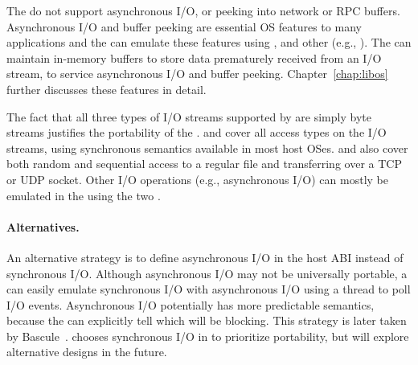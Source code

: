The \hostapis{} do not support asynchronous I/O, or peeking into network or RPC buffers.
Asynchronous I/O and buffer peeking are
essential OS features to many applications
and the \libos{} can emulate
these features
using , 
and other \hostapis{}
(e.g., ).
The \libos{} can maintain in-memory buffers to store data prematurely received from an I/O stream,
to service asynchronous I/O and buffer peeking.
Chapter~\ref{chap:libos} further discusses these features in detail.




The fact that
all three types of I/O streams
supported by  are simply byte streams justifies the portability of the \hostapis{}.
 and  cover all access types on the I/O streams,
using synchronous semantics available in most host OSes.
 and 
also cover both random and sequential access
to a regular file
and transferring over a TCP or UDP socket. 
Other I/O operations (e.g., asynchronous I/O) can mostly be emulated in the \libos{} using the two \hostapis{}.

\paragraph{Alternatives.}
An alternative strategy is to define asynchronous I/O in the host ABI instead of synchronous I/O.
Although asynchronous I/O may not be universally portable,
a \libos{} can easily emulate synchronous I/O with asynchronous I/O using a thread to poll I/O events.
Asynchronous I/O
potentially has more predictable semantics,
because the \libos{} can explicitly tell which \hostapis{} will be blocking.
This strategy
is later taken by Bascule~\cite{baumann13bascule}.
\graphene{} chooses synchronous I/O in \thehostabi{}
to prioritize portability,
but will explore alternative designs in the future.


